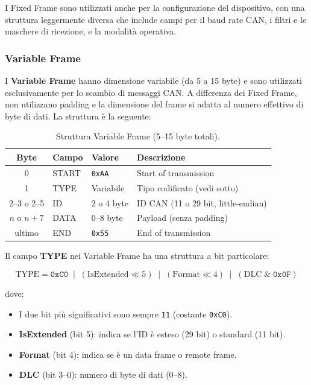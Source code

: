 I Fixed Frame sono utilizzati anche per la configurazione del dispositivo, con una struttura leggermente diversa che include campi per il baud rate CAN, i filtri e le maschere di ricezione, e la modalità operativa.

\subsubsection{Variable Frame}

I \textbf{Variable Frame} hanno dimensione variabile (da 5 a 15 byte) e sono utilizzati esclusivamente per lo scambio di messaggi CAN. A differenza dei Fixed Frame, non utilizzano padding e la dimensione del frame si adatta al numero effettivo di byte di dati. La struttura è la seguente:

\begin{table}[htbp]
    \centering
    \caption{Struttura Variable Frame (5--15 byte totali).}
    \label{tab:variable_frame}
    \begin{tabular}{clll}
        \toprule
        \textbf{Byte} & \textbf{Campo} & \textbf{Valore} & \textbf{Descrizione}                \\
        \midrule
        0             & START          & \texttt{0xAA}   & Start of transmission               \\
        1             & TYPE           & Variabile       & Tipo codificato (vedi sotto)        \\
        2--3 o 2--5   & ID             & 2 o 4 byte      & ID CAN (11 o 29 bit, little-endian) \\
        $n$ o $n+7$   & DATA           & 0--8 byte       & Payload (senza padding)             \\
        ultimo        & END            & \texttt{0x55}   & End of transmission                 \\
        \bottomrule
    \end{tabular}
\end{table}

Il campo \textbf{TYPE} nei Variable Frame ha una struttura a bit particolare:

\begin{equation}
    \text{TYPE} = \texttt{0xC0} \;\; | \;\; (\text{IsExtended} \ll 5) \;\; | \;\; (\text{Format} \ll 4) \;\; | \;\; (\text{DLC} \;\&\; \texttt{0x0F})
\end{equation}

dove:
\begin{itemize}
    \item I due bit più significativi sono sempre \texttt{11} (costante \texttt{0xC0}).
    \item \textbf{IsExtended} (bit 5): indica se l'ID è esteso (29 bit) o standard (11 bit).
    \item \textbf{Format} (bit 4): indica se è un data frame o remote frame.
    \item \textbf{DLC} (bit 3--0): numero di byte di dati (0--8).
\end{itemize}

